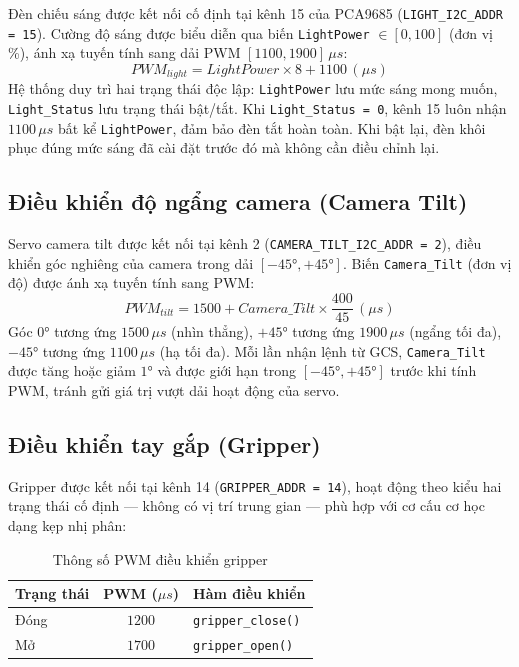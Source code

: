 \documentclass[../DoAn.tex]{subfiles}
\begin{document}
Đèn chiếu sáng được kết nối cố định tại kênh 15 của PCA9685
(\texttt{LIGHT\_I2C\_ADDR = 15}). Cường độ sáng được biểu diễn qua
biến \texttt{LightPower} $\in [0, 100]$ (đơn vị \%), ánh xạ tuyến
tính sang dải PWM $[1100, 1900]\,\mu s$:
\begin{equation}
    PWM_{light} = LightPower \times 8 + 1100\,(\mu s)
\end{equation}
Hệ thống duy trì hai trạng thái độc lập: \texttt{LightPower} lưu mức
sáng mong muốn, \texttt{Light\_Status} lưu trạng thái bật/tắt. Khi
\texttt{Light\_Status = 0}, kênh 15 luôn nhận $1100\,\mu s$ bất kể
\texttt{LightPower}, đảm bảo đèn tắt hoàn toàn. Khi bật lại, đèn
khôi phục đúng mức sáng đã cài đặt trước đó mà không cần điều chỉnh
lại.

\subsection{Điều khiển độ ngẩng camera (Camera Tilt)}

Servo camera tilt được kết nối tại kênh 2
(\texttt{CAMERA\_TILT\_I2C\_ADDR = 2}), điều khiển góc nghiêng của
camera trong dải $[-45°, +45°]$. Biến \texttt{Camera\_Tilt} (đơn vị
độ) được ánh xạ tuyến tính sang PWM:
\begin{equation}
    PWM_{tilt} = 1500 + Camera\_Tilt \times \frac{400}{45}\,(\mu s)
\end{equation}
Góc $0°$ tương ứng $1500\,\mu s$ (nhìn thẳng), $+45°$ tương ứng
$1900\,\mu s$ (ngẩng tối đa), $-45°$ tương ứng $1100\,\mu s$ (hạ tối
đa). Mỗi lần nhận lệnh từ GCS, \texttt{Camera\_Tilt} được tăng hoặc
giảm $1°$ và được giới hạn trong $[-45°, +45°]$ trước khi tính PWM,
tránh gửi giá trị vượt dải hoạt động của servo.

\subsection{Điều khiển tay gắp (Gripper)}

Gripper được kết nối tại kênh 14 (\texttt{GRIPPER\_ADDR = 14}), hoạt
động theo kiểu hai trạng thái cố định --- không có vị trí trung gian
--- phù hợp với cơ cấu cơ học dạng kẹp nhị phân:

\begin{table}[H]
\centering
\renewcommand{\arraystretch}{1.3}
\begin{tabular}{|l|c|l|}
\hline
\textbf{Trạng thái} & \textbf{PWM ($\mu s$)} & \textbf{Hàm điều khiển} \\
\hline
Đóng & $1200$ & \texttt{gripper\_close()} \\
Mở   & $1700$ & \texttt{gripper\_open()} \\
\hline
\end{tabular}
\caption{Thông số PWM điều khiển gripper}
\label{tab:gripper_pwm}
\end{table}
\end{document}
